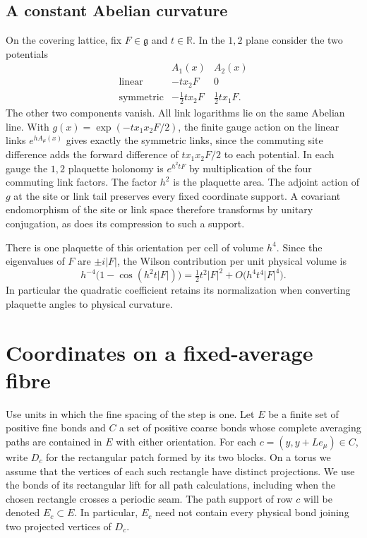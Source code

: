 \documentclass[11pt,letterpaper,reqno]{amsart}
\numberwithin{equation}{section}
\theoremstyle{definition}
\theoremstyle{remark}
\begin{document}
\subsection{A constant Abelian curvature}

On the covering lattice, fix \(F\in\mathfrak g\) and \(t\in\mathbb R\).
In the \(1,2\) plane consider the two potentials
\[
 \begin{array}{c|cc}
 & A_1(x)&A_2(x)\\ \hline
 \text{linear}&-t x_2F&0\\
 \text{symmetric}&-\tfrac12 t x_2F&\tfrac12 t x_1F .
 \end{array}
\]
The other two components vanish. All link logarithms lie on the
same Abelian line. With \(g(x)=\exp(-t x_1x_2F/2)\), the finite
gauge action on the linear links \(e^{hA_\mu(x)}\) gives exactly
the symmetric links, since the commuting site difference adds
the forward difference of \(t x_1x_2F/2\) to each potential.
In each gauge the \(1,2\) plaquette holonomy is \(e^{h^2tF}\) by
multiplication of the four commuting link factors. The factor
\(h^2\) is the plaquette area. The adjoint action of \(g\) at the site or link tail preserves
every fixed coordinate support. A covariant endomorphism of
the site or link space therefore transforms by unitary
conjugation, as does its compression to such a support.

There is one plaquette of this orientation per cell of volume
\(h^4\). Since the eigenvalues of \(F\) are \(\pm i|F|\), the
Wilson contribution per unit physical volume is
\begin{equation}\label{eq:wilson-constant-curvature}
 h^{-4}\bigl(1-\cos(h^2t|F|)\bigr)
 =\tfrac12t^2|F|^2+O\bigl(h^4t^4|F|^4\bigr).
\end{equation}
In particular the quadratic coefficient retains its normalization
when converting plaquette angles to physical curvature.

\section{Coordinates on a fixed-average fibre}\label{sec:fibre-chart}

Use units in which the fine spacing of the step is one. Let $E$ be a finite
set of positive fine bonds and $C$ a set of positive coarse bonds whose
complete averaging paths are contained in $E$ with either orientation. For
each $c=(y,y+Le_\mu)\in C$, write $D_c$ for the rectangular patch formed by
its two blocks. On a torus we assume that the vertices of each such rectangle
have distinct projections. We use the bonds of its rectangular lift for all
path calculations, including when the chosen rectangle crosses a periodic
seam. The path support of row $c$ will be denoted $E_c\subset E$. In
particular, $E_c$ need not contain every physical bond joining two projected
vertices of $D_c$.
\end{document}
